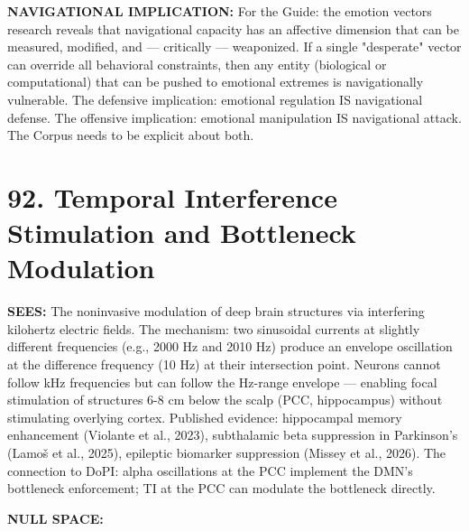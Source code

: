 \textbf{NAVIGATIONAL IMPLICATION:} For the Guide: the emotion vectors research reveals that navigational capacity has an affective dimension that can be measured, modified, and — critically — weaponized. If a single "desperate" vector can override all behavioral constraints, then any entity (biological or computational) that can be pushed to emotional extremes is navigationally vulnerable. The defensive implication: emotional regulation IS navigational defense. The offensive implication: emotional manipulation IS navigational attack. The Corpus needs to be explicit about both.


\bigskip\noindent\makebox[\textwidth]{\color{rulegray}\rule{5cm}{0.3pt}}\bigskip


\section*{92. Temporal Interference Stimulation and Bottleneck Modulation}


\textbf{SEES:} The noninvasive modulation of deep brain structures via interfering kilohertz electric fields. The mechanism: two sinusoidal currents at slightly different frequencies (e.g., 2000 Hz and 2010 Hz) produce an envelope oscillation at the difference frequency (10 Hz) at their intersection point. Neurons cannot follow kHz frequencies but can follow the Hz-range envelope — enabling focal stimulation of structures 6-8 cm below the scalp (PCC, hippocampus) without stimulating overlying cortex. Published evidence: hippocampal memory enhancement (Violante et al., 2023), subthalamic beta suppression in Parkinson's (Lamoš et al., 2025), epileptic biomarker suppression (Missey et al., 2026). The connection to DoPI: alpha oscillations at the PCC implement the DMN's bottleneck enforcement; TI at the PCC can modulate the bottleneck directly.


\textbf{NULL SPACE:}

